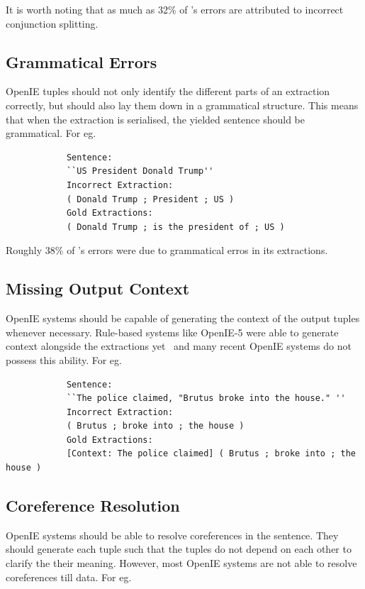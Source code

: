         It is worth noting that as much as 32\% of \shortname's errors are attributed to incorrect conjunction splitting.

    \subsection{Grammatical Errors}

        OpenIE tuples should not only identify the different parts of an extraction correctly, but should also lay them down in a grammatical structure. This means that when the extraction is serialised, the yielded sentence should be grammatical. For eg.

        \begin{verbatim}
            Sentence:
            ``US President Donald Trump''
            Incorrect Extraction:
            ( Donald Trump ; President ; US )
            Gold Extractions:
            ( Donald Trump ; is the president of ; US )
        \end{verbatim}

        Roughly 38\% of \shortname's errors were due to grammatical erros in its extractions.

    \subsection{Missing Output Context}

        OpenIE systems should be capable of generating the context of the output tuples whenever necessary. Rule-based systems like OpenIE-5 were able to generate context alongside the extractions yet \shortname\ and many recent OpenIE systems do not possess this ability. For eg.

        \begin{verbatim}
            Sentence:
            ``The police claimed, "Brutus broke into the house." ''
            Incorrect Extraction:
            ( Brutus ; broke into ; the house )
            Gold Extractions:
            [Context: The police claimed] ( Brutus ; broke into ; the house )
        \end{verbatim}

    \subsection{Coreference Resolution}

        OpenIE systems should be able to resolve coreferences in the sentence. They should generate each tuple such that the tuples do not depend on each other to clarify the their meaning. However, most OpenIE systems are not able to resolve coreferences till data. For eg.

